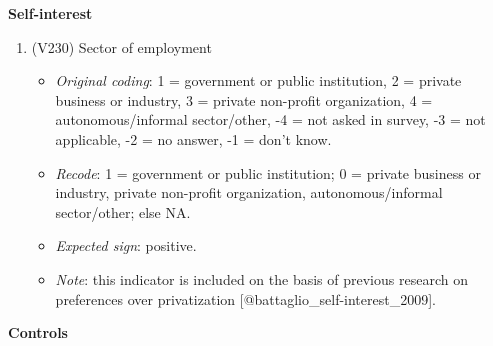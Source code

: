 \documentclass[]{article}
\begin{document}
\textbf{Self-interest}

\begin{enumerate}
 \item (V230) Sector of employment 
 \begin{itemize}
 \item \textit{Original coding}: 1 = government or public institution, 2 = private business or industry, 3 = private non-profit organization, 4 = autonomous/informal sector/other, -4 = not asked in survey, -3 = not applicable, -2 = no answer, -1 = don't know.
 \item \textit{Recode}: 1 = government or public institution; 0 = private business or industry, private non-profit organization, autonomous/informal sector/other; else NA.
 \item \textit{Expected sign}: positive. 
 \item \textit{Note}: this indicator is included on the basis of previous research on preferences over privatization [@battaglio_self-interest_2009].
 \end{itemize}
\end{enumerate}

\textbf{Controls}
\end{document}
